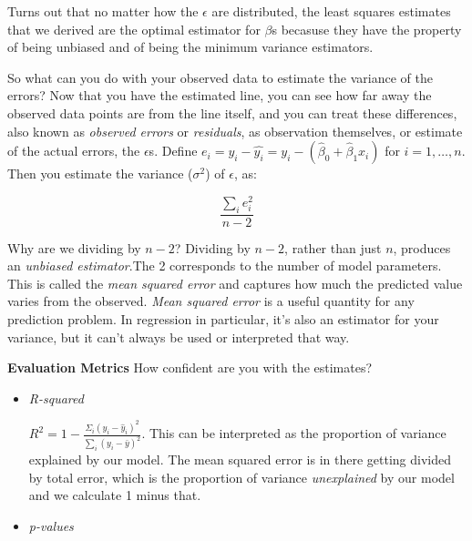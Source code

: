 \begin{tcolorbox}[enhanced jigsaw, breakable, pad at break*=1mm, colback=gray!20!white, colframe=black!85!black, title=\textbf{How to fit the model?}]
    Turns out that no matter how the \(\epsilon\) are distributed, the least squares estimates that we derived are the optimal estimator for \(\beta\)s becasuse they have the property of being unbiased and of being the minimum variance estimators.
\end{tcolorbox}

So what can you do with your observed data to estimate the variance of the errors? Now that you have the estimated line, you can see how far away the observed data points are from the line itself, and you can treat these differences, also known as \textit{observed errors} or \textit{residuals}, as observation themselves, or estimate of the actual errors, the \(\epsilon\)s. Define \(e_{i}=y_{i}-\hat{y_{i}}=y_{i}-\left(\hat{\beta}_{0}+\hat{\beta}_{1} x_{i}\right)\) for \(i=1, \ldots, n\). Then you estimate the variance (\(\sigma^{2}\)) of \(\epsilon\), as:

\begin{equation}
    \frac{\sum_{i} e_{i}^{2}}{n-2}
\end{equation}

Why are we dividing by \(n-2\)? Dividing by \(n-2\), rather than just \(n\), produces an \textit{unbiased estimator}.The 2 corresponds to the number of model parameters. This is called the \textit{mean squared error} and captures how much the predicted value varies from the observed. \textit{Mean squared error} is a useful quantity for any prediction problem. In regression in particular, it's also an estimator for your variance, but it can't always be used or interpreted that way.

\textbf{Evaluation Metrics} How confident are you with the estimates?
\begin{itemize}
    \item \textit{R-squared}

          \(R^{2}=1-\frac{\Sigma_{i}\left(y_{i}-\hat{y}_{i}\right)^{2}}{\sum_{i}\left(y_{i}-\bar{y}\right)^{2}}\). This can be interpreted as the proportion of variance explained by our model. The mean squared error is in there getting divided by total error, which is the proportion of variance \textit{unexplained} by our model and we calculate 1 minus that.

    \item \textit{p-values}


\end{itemize}

